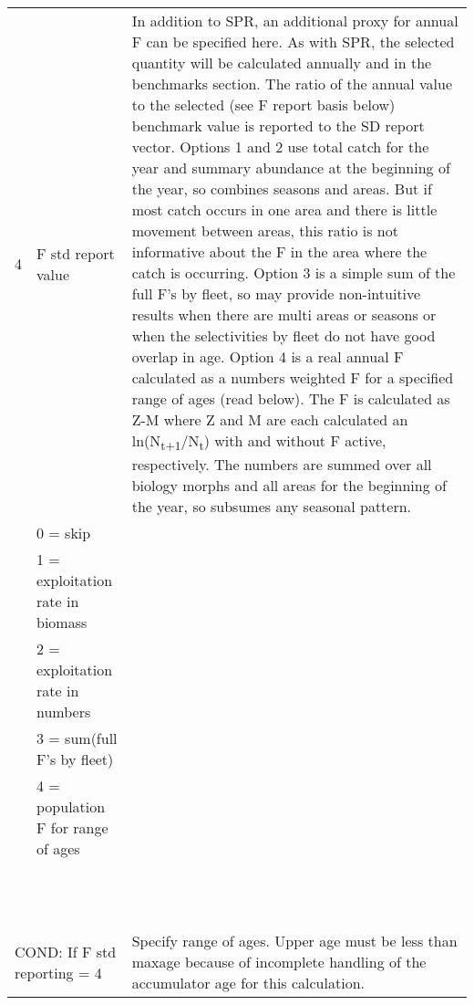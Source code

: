 \begin{landscape}
\begin{longtable}{p{3cm} p{7cm} p{11cm}}
 \hline 
 4 & F std report value &  \multirow{1}{1cm}[-0.1cm]{\parbox{11cm}{In addition to SPR, an additional proxy for annual F can be specified here.  As with SPR, the selected quantity will be calculated annually and in the benchmarks section.  The ratio of the annual value to the selected (see F report basis below) benchmark value is reported to the SD report vector.  Options 1 and 2 use total catch for the year and summary abundance at the beginning of the year, so combines seasons and areas.  But if most catch occurs in one area and there is little movement between areas, this ratio is not informative about the F in the area where the catch is occurring.  Option 3 is a simple sum of the full F’s by fleet, so may provide non-intuitive results when there are multi areas or seasons or when the selectivities by fleet do not have good overlap in age.  Option 4 is a real annual F calculated as a numbers weighted F for a specified range of ages (read below).  The F is calculated as Z-M where Z and M are each calculated an ln(N\textsubscript{t+1}/N\textsubscript{t}) with and without F active, respectively. The numbers are summed over all biology morphs and all areas for the beginning of the year, so subsumes any seasonal pattern.}}\\
   & 0 = skip & \\
   & 1 = exploitation rate in biomass & \\
   & 2 = exploitation rate in numbers & \\
   & 3 = sum(full F's by fleet) & \\
   & 4 = population F for range of ages & \\
   & & \\
   & & \\
   & & \\
   & & \\
   & & \\
   & & \\
   & & \\  
   & & \\
   & & \\
   & & \\  
   & & \\
   & & \\
  
 \multicolumn{2}{l}{COND: If F std reporting = 4 } & \multirow{1}{1cm}[-0.1cm]{\parbox{11cm}{Specify range of ages. Upper age must be less than maxage because of incomplete handling of the accumulator age for this calculation.}} \\


\end{longtable}
\end{landscape}

